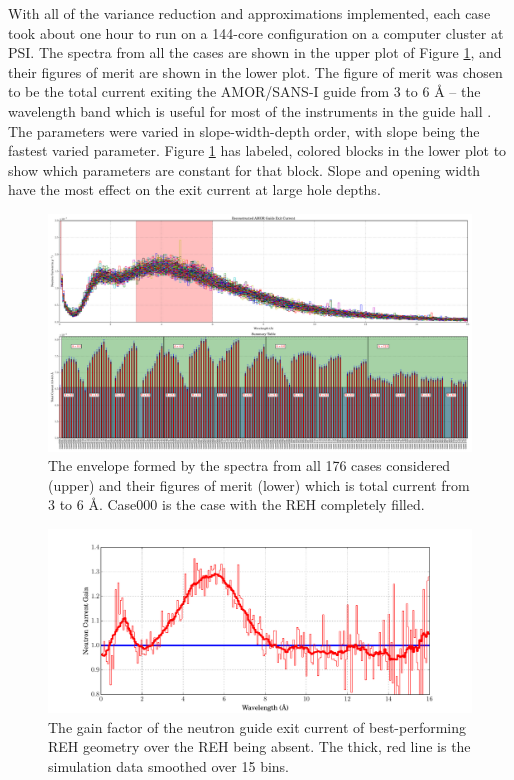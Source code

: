 \documentclass[a4paper]{jpconf}
\begin{document}
With all of the variance reduction and approximations implemented, each case took about one hour to run on a 144-core configuration on a computer cluster at PSI.  The spectra from all the cases are shown in the upper plot of Figure \ref{parametric_REH}, and their figures of merit are shown in the lower plot.  The figure of merit was chosen to be the total current exiting the AMOR/SANS-I guide from 3 to 6 \AA{} -- the wavelength band which is useful for most of the instruments in the guide hall \cite{intruments_wavelength}.  The parameters were varied in slope-width-depth order, with slope being the fastest varied parameter. Figure \ref{parametric_REH} has labeled, colored blocks in the lower plot to show which parameters are constant for that block.  Slope and opening width have the most effect on the exit current at large hole depths.

\begin{figure}
\begin{center}
\includegraphics[scale=0.26,trim={0cm 0cm 0cm 0cm},clip]{graphics/parametric_REH.pdf}
\end{center}
\caption{\label{parametric_REH}The envelope formed by the spectra from all 176 cases considered (upper) and their figures of merit (lower) which is total current from 3 to 6 \AA{}.  Case000 is the case with the REH completely filled.}
\end{figure}

\begin{figure}
\begin{center}
\includegraphics[scale=0.38,trim={0cm 0cm 0cm 0cm},clip]{graphics/parametric_gain.pdf}
\end{center}
\caption{\label{parametric_gain}The gain factor of the neutron guide exit current of best-performing REH geometry over the REH being absent.  The thick, red line is the simulation data smoothed over 15 bins.}
\end{figure}
\end{document}
